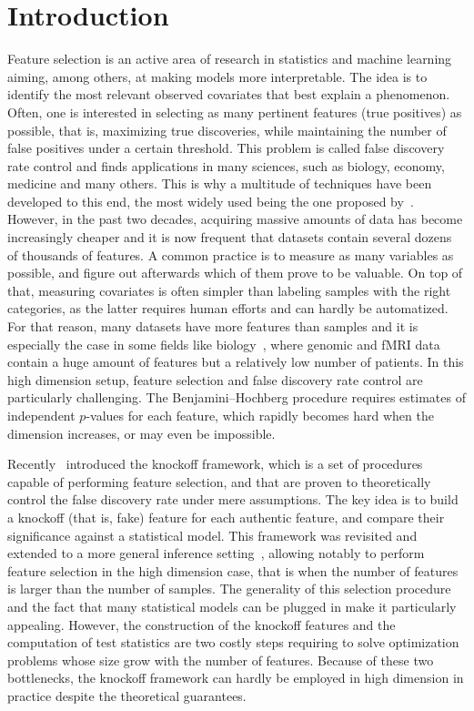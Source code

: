 \cleardoublepage
\chapter*{Introduction}

Feature selection is an active area of research in statistics and machine learning
aiming, among others, at making models more interpretable.
The idea is to identify the most relevant observed covariates that best explain a phenomenon.
Often, one is interested in selecting as many pertinent features (true positives) as possible,
that is, maximizing true discoveries,
while maintaining the number of false positives under a certain threshold.
This problem is called false discovery rate control and finds applications in many sciences,
such as biology, economy, medicine and many others.
This is why a multitude of techniques have been developed to this end,
the most widely used being the one proposed by~\cite{bh}.
However, in the past two decades, acquiring massive amounts of data has become increasingly cheaper
and it is now frequent that datasets contain several dozens of thousands of features.
A common practice is to measure as many variables as possible,
and figure out afterwards which of them prove to be valuable.
On top of that, measuring covariates is often simpler than labeling samples with the right categories,
as the latter requires human efforts and can hardly be automatized.
For that reason, many datasets have more features than samples
and it is especially the case in some fields like biology~\citep{statistical_inference_genome},
where genomic and fMRI data contain a huge amount of features but a relatively low number of patients.
In this high dimension setup, feature selection and false discovery rate control are particularly challenging.
The Benjamini–Hochberg procedure requires estimates of independent $p$-values for each feature,
which rapidly becomes hard when the dimension increases,
or may even be impossible.

Recently~\citet{fixed_x_knockoffs} introduced the knockoff framework,
which is a set of procedures capable of performing feature selection,
and that are proven to theoretically control the false discovery rate under mere assumptions.
The key idea is to build a knockoff (that is, fake) feature for each authentic feature,
and compare their significance against a statistical model.
This framework was revisited and extended to a more general inference setting~\citep{model_x_knockoffs},
allowing notably to perform feature selection in the high dimension case,
that is when the number of features is larger than the number of samples.
The generality of this selection procedure
and the fact that many statistical models can be plugged in make it particularly appealing.
However, the construction of the knockoff features and the computation of test statistics
are two costly steps requiring to solve optimization problems whose size grow with the number of features.
Because of these two bottlenecks,
the knockoff framework can hardly be employed in high dimension in practice despite the theoretical guarantees.

